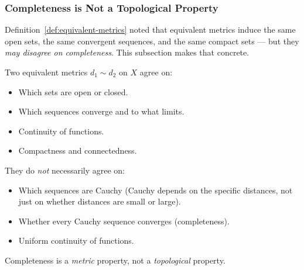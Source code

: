 %

\subsubsection{Completeness is Not a Topological Property}
\label{sec:completeness-not-topological}

Definition~\ref{def:equivalent-metrics} noted that equivalent metrics
induce the same open sets, the same convergent sequences, and the same
compact sets --- but they \emph{may disagree on completeness}.
This subsection makes that concrete.

\begin{remark*}
Two equivalent metrics $d_1 \sim d_2$ on $X$ agree on:
\begin{itemize}
  \item Which sets are open or closed.
  \item Which sequences converge and to what limits.
  \item Continuity of functions.
  \item Compactness and connectedness.
\end{itemize}
They do \emph{not} necessarily agree on:
\begin{itemize}
  \item Which sequences are Cauchy (Cauchy depends on the specific distances,
        not just on whether distances are small or large).
  \item Whether every Cauchy sequence converges (completeness).
  \item Uniform continuity of functions.
\end{itemize}
Completeness is a \emph{metric} property, not a \emph{topological} property.
\end{remark*}

